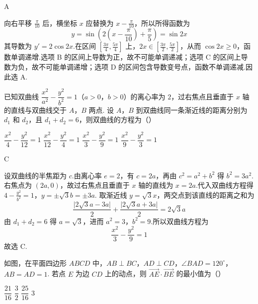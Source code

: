 \begin{answer}
A
\end{answer}

\begin{solution}
向右平移 \(\frac\pi{10}\) 后，横坐标 \(x\) 应替换为 \(x-\frac\pi{10}\)，所以所得函数为
\[
y=\sin\left(2\left(x-\frac\pi{10}\right)+\frac\pi5\right)=\sin2x
\]
其导数为 \(y'=2\cos2x\).在区间 \([\frac{3\pi}{4},\frac{5\pi}{4}]\) 上，\(2x\in[\frac{3\pi}{2},\frac{5\pi}{2}]\)，从而 \(\cos2x\ge0\)，函数单调递增.选项 B 的区间上导数为正，故不可能单调递减；选项 C 的区间上导数为负，故不可能单调递增；选项 D 的区间包含导数变号点，函数不单调递减.因此选 A.
\end{solution}

\begin{problem}
已知双曲线 \(\dfrac{x^2}{a^2}-\dfrac{y^2}{b^2}=1\)（\(a>0\)，\(b>0\)）的离心率为 \(2\)，过右焦点且垂直于 \(x\) 轴的直线与双曲线交于 \(A\)，\(B\) 两点. 设 \(A\)，\(B\) 到双曲线同一条渐近线的距离分别为 \(d_1\) 和 \(d_2\)，且 \(d_1+d_2=6\)，则双曲线的方程为（\quad）

\choices
    {\(\dfrac{x^2}{4}-\dfrac{y^2}{12}=1\)}
    {\(\dfrac{x^2}{12}-\dfrac{y^2}{4}=1\)}
    {\(\dfrac{x^2}{3}-\dfrac{y^2}{9}=1\)}
    {\(\dfrac{x^2}{9}-\dfrac{y^2}{3}=1\)}
\end{problem}

\begin{answer}
C
\end{answer}

\begin{solution}
设双曲线的半焦距为 \(c\).由离心率 \(e=2\)，有 \(c=2a\)，再由 \(c^2=a^2+b^2\) 得 \(b^2=3a^2\).右焦点为 \((2a,0)\)，故过右焦点且垂直于 \(x\) 轴的直线为 \(x=2a\).代入双曲线方程得
\(4-\frac{y^2}{b^2}=1\)，\(y=\pm\sqrt3b=\pm3a\).
取渐近线 \(y=\sqrt3x\)，两交点到该直线的距离之和为
\[
\frac{\lvert2\sqrt3a-3a\rvert}{2}+\frac{\lvert2\sqrt3a+3a\rvert}{2}=2\sqrt3a
\]
由 \(d_1+d_2=6\) 得 \(a=\sqrt3\)，进而 \(a^2=3\)，\(b^2=9\).所以双曲线方程为
\[
\frac{x^2}{3}-\frac{y^2}{9}=1
\]
故选 C.
\end{solution}

\begin{problem}
如图，在平面四边形 \(ABCD\) 中，\(AB\perp BC\)，\(AD\perp CD\)，\(\angle BAD=120^\circ\)，\(AB=AD=1\). 若点 \(E\) 为边 \(CD\) 上的动点，则 \(\overrightarrow{AE}\cdot\overrightarrow{BE}\) 的最小值为（\quad）


\choices
    {\(\dfrac{21}{16}\)}
    {\(\dfrac32\)}
    {\(\dfrac{25}{16}\)}
    {\(3\)}
\end{problem}

